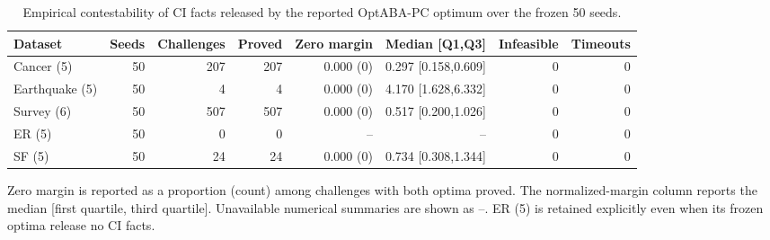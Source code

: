 \begin{table}[t]
\centering
\small
\caption{Empirical contestability of CI facts released by the reported OptABA-PC optimum over the frozen 50 seeds.}
\label{tab:empirical-contestability}
\begin{tabular}{lrrrrrrr}
\toprule
Dataset & Seeds & Challenges & Proved & Zero margin & Median [Q1,Q3] & Infeasible & Timeouts \\
\midrule
Cancer (5) & 50 & 207 & 207 & 0.000 (0) & 0.297 [0.158,0.609] & 0 & 0 \\
Earthquake (5) & 50 & 4 & 4 & 0.000 (0) & 4.170 [1.628,6.332] & 0 & 0 \\
Survey (6) & 50 & 507 & 507 & 0.000 (0) & 0.517 [0.200,1.026] & 0 & 0 \\
ER (5) & 50 & 0 & 0 & -- & -- & 0 & 0 \\
SF (5) & 50 & 24 & 24 & 0.000 (0) & 0.734 [0.308,1.344] & 0 & 0 \\
\bottomrule
\end{tabular}
\begin{minipage}{0.98\textwidth}
\footnotesize
Zero margin is reported as a proportion (count) among challenges with both optima proved. The normalized-margin column reports the median [first quartile, third quartile]. Unavailable numerical summaries are shown as --. ER (5) is retained explicitly even when its frozen optima release no CI facts.
\end{minipage}
\end{table}
